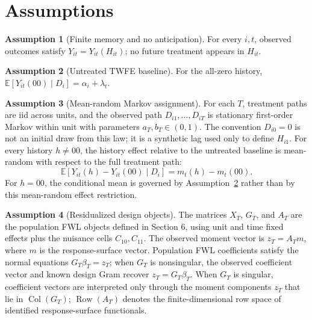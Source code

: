 \documentclass[11pt]{article}
\newcommand{\E}{\mathbb{E}}
\theoremstyle{definition}
\newtheorem{assumption}{Assumption}
\theoremstyle{plain}
\theoremstyle{remark}
\begin{document}
\section{Assumptions}
\begin{assumption}[Finite memory and no anticipation]\label{ass:finite-memory}
For every \(i,t\), observed outcomes satisfy \(Y_{it}=Y_{it}(H_{it})\); no future treatment appears in \(H_{it}\).
\end{assumption}

\begin{assumption}[Untreated TWFE baseline]\label{ass:untreated-twfe}
For the all-zero history, \(\E[Y_{it}(00)\mid D_i]=\alpha_i+\lambda_t\).
\end{assumption}

\begin{assumption}[Mean-random Markov assignment]\label{ass:markov-assignment}
For each \(T\), treatment paths are iid across units, and the observed path \(D_{i1},\ldots,D_{iT}\) is stationary first-order Markov within unit with parameters \(a_T,b_T\in(0,1)\).
The convention \(D_{i0}=0\) is not an initial draw from this law; it is a synthetic lag used only to define \(H_{i1}\).
For every history \(h\ne00\), the history effect relative to the untreated baseline is mean-random with respect to the full treatment path:
\[
\E\!\left[Y_{it}(h)-Y_{it}(00)\mid D_i\right]=m_t(h)-m_t(00).
\]
For \(h=00\), the conditional mean is governed by Assumption~\ref{ass:untreated-twfe} rather than by this mean-random effect restriction.
\end{assumption}

\begin{assumption}[Residualized design objects]\label{ass:fwl-objects}
The matrices \(X_T\), \(G_T\), and \(A_T\) are the population FWL objects defined in Section 6, using unit and time fixed effects plus the nuisance cells \(C_{10},C_{11}\).
The observed moment vector is \(z_T=A_Tm\), where \(m\) is the response-surface vector.
Population FWL coefficients satisfy the normal equations \(G_T\beta_T=z_T\); when \(G_T\) is nonsingular, the observed coefficient vector and known design Gram recover \(z_T=G_T\beta_T\).
When \(G_T\) is singular, coefficient vectors are interpreted only through the moment components \(z_T\) that lie in \(\operatorname{Col}(G_T)\); \(\operatorname{Row}(A_T)\) denotes the finite-dimensional row space of identified response-surface functionals.
\end{assumption}
\end{document}
